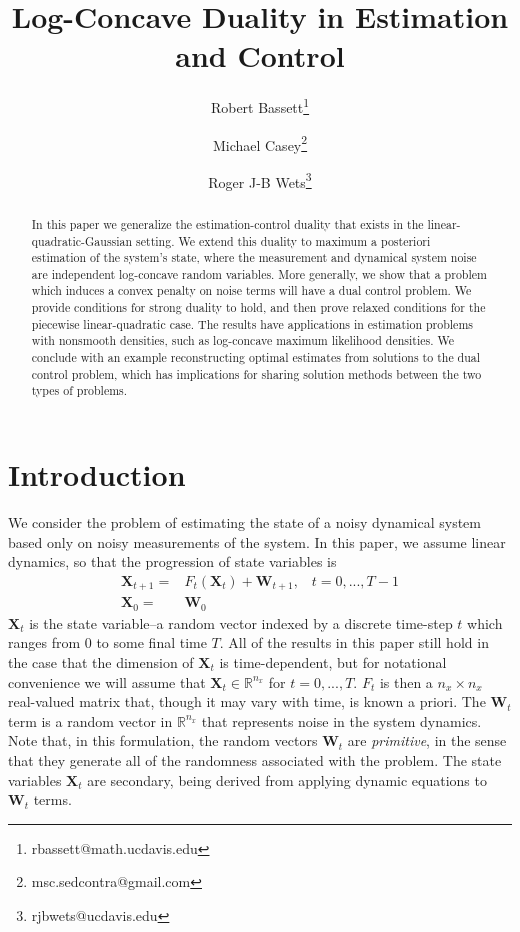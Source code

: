 \documentclass[12pt]{article}
\title{Log-Concave Duality in Estimation and Control\\}
\author{Robert Bassett\thanks{rbassett@math.ucdavis.edu}}
\author{Michael Casey\thanks{msc.sedcontra@gmail.com}}
\author{Roger J-B Wets\thanks{rjbwets@ucdavis.edu}}
\affil{Department of Mathematics, Univ. California Davis}
\date{}
\renewcommand{\vec}[1]{\mathbf{#1}}
\theoremstyle{remark}
\theoremstyle{remark}
\begin{document}
\maketitle

\begin{abstract} In this paper we generalize the estimation-control
duality that exists in the linear-quadratic-Gaussian setting.
We extend this duality to maximum a posteriori estimation of the
system's state, where the measurement and
dynamical system noise are independent log-concave random variables.
More generally, we show that a problem which induces 
a convex penalty on noise terms will have a dual control problem.
We provide conditions for strong duality to hold, and then prove
relaxed conditions for the piecewise linear-quadratic case.
The results have applications in estimation problems with nonsmooth
densities, such as log-concave maximum likelihood densities.
 We conclude with an example reconstructing optimal
estimates from solutions to the dual control problem, which has
implications for sharing solution methods between the two types of
problems. 
\end{abstract}

\section{Introduction}
We consider the problem of estimating the state of a noisy dynamical
system  based only on noisy measurements of the system. In this paper,
we assume linear dynamics, so that the progression of state
variables is
\begin{align} \label{estdynamics}
\vec{X}_{t+1} =& F_{t}(\vec{X}_{t}) + \vec{W}_{t+1}, \; \; \;
t=0,...,T-1 \\
\vec{X}_{0} =& \vec{W}_{0}
\end{align}
$\vec{X}_{t}$ is the state variable--a random vector indexed by a discrete time-step
$t$ which ranges from $0$ to some final time $T$. 
All of the results in this paper still hold in the case that the 
dimension of $\vec{X}_{t}$
is time-dependent, but for notational convenience we will assume that
$\vec{X}_{t} \in \mathbb{R}^{n_{x}}$ for $t=0,...,T$. $F_{t}$ is then a
$n_{x} \times n_{x}$ real-valued matrix that, though it may vary with
time, is known a priori. The $\vec{W}_{t}$ term is a random vector in $\mathbb{R}^{n_x}$ that
represents noise in the system dynamics. Note that, in this
formulation, the random vectors $\vec{W}_{t}$ are \emph{primitive}, in
the sense that they generate all of the randomness associated with the
problem. The state variables $\vec{X}_{t}$ are secondary, being
derived from applying dynamic equations to $\vec{W}_{t}$ terms.
\end{document}
